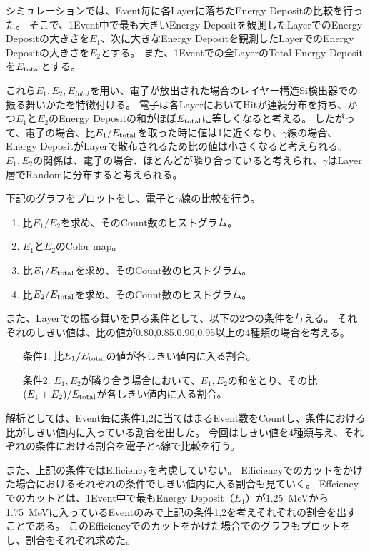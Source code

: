 \documentclass[a4paper,10pt]{jreport}
\begin{document}
シミュレーションでは、Event毎に各Layerに落ちたEnergy Depositの比較を行った。
そこで、1Event中で最も大きいEnergy Depositを観測したLayerでのEnergy Depositの大きさを$E_1$、次に大きなEnergy Depositを観測したLayerでのEnergy Depositの大きさを$E_2$とする。
また、1Eventでの全LayerのTotal Energy Depositを$E_{\rm{total}}$とする。

これら$E_1,E_2,E_{total}$を用い、電子が放出された場合のレイヤー構造Si検出器での振る舞いかたを特徴付ける。
電子は各LayerにおいてHitが連続分布を持ち、かつ$E_1$と$E_2$のEnergy Depositの和がほぼ$E_{\rm{total}}$に等しくなると考える。
したがって、電子の場合、比$E_1/E_{\rm{total}}$を取った時に値は1に近くなり、$\gamma$線の場合、Energy DepositがLayerで散布されるため比の値は小さくなると考えられる。
$E_1,E_2$の関係は、電子の場合、ほとんどが隣り合っていると考えられ、$\gamma$はLayer層でRandomに分布すると考えられる。

下記のグラフをプロットをし、電子と$\gamma$線の比較を行う。

\begin{enumerate}
	\item 比$E_1/E_2$を求め、そのCount数のヒストグラム。
	\item $E_1$と$E_2$のColor map。
	\item 比$E_1/E_{\rm{total}}$を求め、そのCount数のヒストグラム。
	\item 比$E_2/E_{\rm{total}}$を求め、そのCount数のヒストグラム。
\end{enumerate}

また、Layerでの振る舞いを見る条件として、以下の2つの条件を与える。
それぞれのしきい値は、比の値が0.80,0.85,0.90,0.95以上の4種類の場合を考える。

\begin{enumerate}
	\item[条件1.] 比$E_1/E_{\rm{total}}$の値が各しきい値内に入る割合。
	\item[条件2.] $E_1,E_2$が隣り合う場合において、$E_1,E_2$の和をとり、その比$(E_1+E_2)/E_{\rm{total}}$が各しきい値内に入る割合。
\end{enumerate}

解析としては、Event毎に条件1,2に当てはまるEvent数をCountし、条件における比がしきい値内に入っている割合を出した。
今回はしきい値を4種類与え、それぞれの条件における割合を電子と$\gamma$線で比較を行う。

また、上記の条件ではEfficiencyを考慮していない。
Efficiencyでのカットをかけた場合におけるそれぞれの条件でしきい値内に入る割合も見ていく。
Effciencyでのカットとは、1Event中で最もEnergy Deposit（$E_1$）が\SI{1.25}{MeV}から\SI{1.75}{MeV}に入っているEventのみで上記の条件1,2を考えそれぞれの割合を出すことである。
このEfficiencyでのカットをかけた場合でのグラフもプロットをし、割合をそれぞれ求めた。
\end{document}
